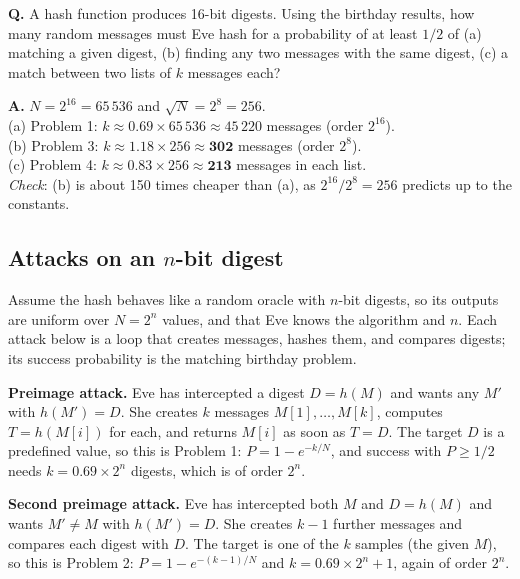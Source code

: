 \begin{worked}
\textbf{Q.} A hash function produces 16-bit digests. Using the birthday results, how many random messages must Eve hash for a probability of at least $1/2$ of (a) matching a given digest, (b) finding any two messages with the same digest, (c) a match between two lists of $k$ messages each?

\textbf{A.} $N = 2^{16} = 65\,536$ and $\sqrt N = 2^8 = 256$.\\
(a) Problem 1: $k \approx 0.69 \times 65\,536 \approx 45\,220$ messages (order $2^{16}$).\\
(b) Problem 3: $k \approx 1.18 \times 256 \approx \mathbf{302}$ messages (order $2^8$).\\
(c) Problem 4: $k \approx 0.83 \times 256 \approx \mathbf{213}$ messages in each list.\\
\emph{Check}: (b) is about 150 times cheaper than (a), as $2^{16}/2^8 = 256$ predicts up to the constants.
\end{worked}

\subsection{Attacks on an $n$-bit digest \new}

Assume the hash behaves like a random oracle with $n$-bit digests, so its outputs are uniform over $N = 2^n$ values, and that Eve knows the algorithm and $n$. Each attack below is a loop that creates messages, hashes them, and compares digests; its success probability is the matching birthday problem.

\textbf{Preimage attack.} Eve has intercepted a digest $D = h(M)$ and wants any $M'$ with $h(M') = D$. She creates $k$ messages $M[1], \dots, M[k]$, computes $T = h(M[i])$ for each, and returns $M[i]$ as soon as $T = D$. The target $D$ is a predefined value, so this is Problem 1: $P = 1 - e^{-k/N}$, and success with $P \ge 1/2$ needs $k = 0.69 \times 2^n$ digests, which is of order $2^n$.

\textbf{Second preimage attack.} Eve has intercepted both $M$ and $D = h(M)$ and wants $M' \ne M$ with $h(M') = D$. She creates $k - 1$ further messages and compares each digest with $D$. The target is one of the $k$ samples (the given $M$), so this is Problem 2: $P = 1 - e^{-(k-1)/N}$ and $k = 0.69 \times 2^n + 1$, again of order $2^n$.

